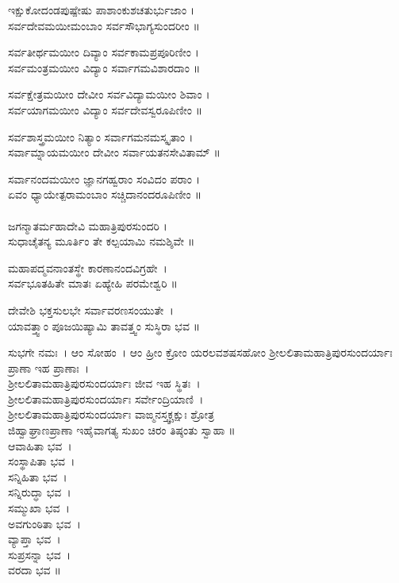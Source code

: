 ಇಕ್ಷುಕೋದಂಡಪುಷ್ಪೇಷು ಪಾಶಾಂಕುಶಚತುರ್ಭುಜಾಂ ।\\
ಸರ್ವದೇವಮಯೀಮಂಬಾಂ ಸರ್ವಸೌಭಾಗ್ಯಸುಂದರೀಂ ॥

ಸರ್ವತೀರ್ಥಮಯೀಂ ದಿವ್ಯಾಂ ಸರ್ವಕಾಮಪ್ರಪೂರಿಣೀಂ ।\\
ಸರ್ವಮಂತ್ರಮಯೀಂ ವಿದ್ಯಾಂ ಸರ್ವಾಗಮವಿಶಾರದಾಂ ॥

ಸರ್ವಕ್ಷೇತ್ರಮಯೀಂ ದೇವೀಂ ಸರ್ವವಿದ್ಯಾಮಯೀಂ ಶಿವಾಂ ।\\
ಸರ್ವಯಾಗಮಯೀಂ ವಿದ್ಯಾಂ ಸರ್ವದೇವಸ್ವರೂಪಿಣೀಂ ॥

ಸರ್ವಶಾಸ್ತ್ರಮಯೀಂ ನಿತ್ಯಾಂ ಸರ್ವಾಗಮನಮಸ್ಕೃತಾಂ ।\\
ಸರ್ವಾಮ್ನಾಯಮಯೀಂ ದೇವೀಂ ಸರ್ವಾಯತನಸೇವಿತಾಮ್ ॥

ಸರ್ವಾನಂದಮಯೀಂ ಜ್ಞಾನಗಹ್ವರಾಂ ಸಂವಿದಂ ಪರಾಂ ।\\
ಏವಂ ಧ್ಯಾಯೇತ್ಪರಾಮಂಬಾಂ ಸಚ್ಚಿದಾನಂದರೂಪಿಣೀಂ ॥\\
\\
ಜಗನ್ಮಾತರ್ಮಹಾದೇವಿ ಮಹಾತ್ರಿಪುರಸುಂದರಿ ।\\
ಸುಧಾಚೈತನ್ಯ ಮೂರ್ತಿಂ ತೇ ಕಲ್ಪಯಾಮಿ ನಮಶ್ಶಿವೇ ॥

ಮಹಾಪದ್ಮವನಾಂತಸ್ಥೇ ಕಾರಣಾನಂದವಿಗ್ರಹೇ~।\\
ಸರ್ವಭೂತಹಿತೇ ಮಾತಃ ಏಹ್ಯೇಹಿ ಪರಮೇಶ್ವರಿ ॥

ದೇವೇಶಿ ಭಕ್ತಸುಲಭೇ ಸರ್ವಾವರಣಸಂಯುತೇ~।\\
ಯಾವತ್ತ್ವಾಂ ಪೂಜಯಿಷ್ಯಾಮಿ ತಾವತ್ತ್ವಂ ಸುಸ್ಥಿರಾ ಭವ ॥


ಸುಭಗೇ ನಮಃ~। ಆಂ ಸೋಹಂ~। ಆಂ ಹ್ರೀಂ ಕ್ರೋಂ ಯರಲವಶಷಸಹೋಂ ಶ್ರೀಲಲಿತಾಮಹಾತ್ರಿಪುರಸುಂದರ್ಯಾಃ ಪ್ರಾಣಾ ಇಹ ಪ್ರಾಣಾಃ~।\\ ಶ್ರೀಲಲಿತಾಮಹಾತ್ರಿಪುರಸುಂದರ್ಯಾಃ ಜೀವ ಇಹ ಸ್ಥಿತಃ~।\\ ಶ್ರೀಲಲಿತಾಮಹಾತ್ರಿಪುರಸುಂದರ್ಯಾಃ ಸರ್ವೇಂದ್ರಿಯಾಣಿ~।\\ಶ್ರೀಲಲಿತಾಮಹಾತ್ರಿಪುರಸುಂದರ್ಯಾಃ ವಾಙ್ಮನಸ್ತ್ವಕ್ಚಕ್ಷುಃ ಶ್ರೋತ್ರ\\ಜಿಹ್ವಾಘ್ರಾಣಪ್ರಾಣಾ ಇಹೈವಾಗತ್ಯ ಸುಖಂ ಚಿರಂ ತಿಷ್ಠಂತು ಸ್ವಾಹಾ ॥\\
ಆವಾಹಿತಾ ಭವ~।\\
 ಸಂಸ್ಥಾಪಿತಾ ಭವ~।\\
 ಸನ್ನಿಹಿತಾ ಭವ~।\\
 ಸನ್ನಿರುದ್ಧಾ ಭವ~।\\
 ಸಮ್ಮುಖಾ ಭವ~।\\
 ಅವಗುಂಠಿತಾ ಭವ~।\\
 ವ್ಯಾಪ್ತಾ ಭವ~।\\
 ಸುಪ್ರಸನ್ನಾ ಭವ~।\\
 ವರದಾ ಭವ ॥


